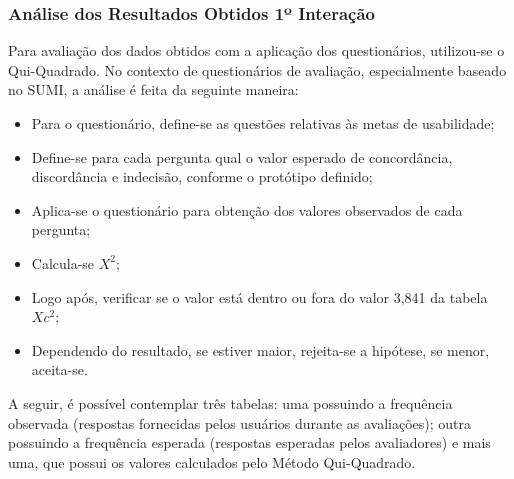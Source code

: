 			\subsubsection[Análise dos Resultados Obtidos para 1º Interação]{Análise dos Resultados Obtidos 1º Interação}
			\label{sec:terceiraAvaliacao_1_Analise}

				Para avaliação dos dados obtidos com a aplicação dos questionários, utilizou-se o Qui-Quadrado. No contexto de questionários de avaliação, especialmente baseado no SUMI, a análise é feita da seguinte maneira:

				\begin{itemize}
					\item{Para o questionário, define-se as questões relativas às metas de usabilidade;}
					\item{Define-se para cada pergunta qual o valor esperado de concordância, discordância e indecisão, conforme o protótipo definido;}
					\item{Aplica-se o questionário para obtenção dos valores observados de cada pergunta;}
					\item{Calcula-se  $X^2$;}
					\item{Logo após, verificar se o valor está dentro ou fora do valor 3,841 da tabela $Xc^2$;}
					\item{Dependendo do resultado, se estiver maior, rejeita-se a hipótese, se menor, aceita-se.}
				\end{itemize}

				A seguir, é possível contemplar três tabelas: uma possuindo a frequência observada (respostas fornecidas pelos usuários durante as avaliações); outra possuindo a frequência esperada (respostas esperadas pelos avaliadores) e mais uma, que possui os valores calculados pelo Método Qui-Quadrado.


